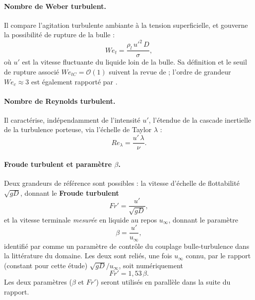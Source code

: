 \paragraph{Nombre de Weber turbulent.} Il compare l'agitation turbulente
ambiante à
la tension superficielle, et gouverne la possibilité de rupture de la
bulle :
\begin{equation}
    We_t = \frac{\rho_l\, u'^2\, D}{\sigma},
    \label{eq:wet}
\end{equation}
où $u'$ est la vitesse fluctuante du liquide loin de la bulle. Sa
définition et le seuil de rupture associé $We_{tC}=\mathcal{O}(1)$ suivent la
revue de \cite{legendre2025} ; l'ordre de grandeur $We_c\approx3$ est
également rapporté par \cite{riviere2021}.

\paragraph{Nombre de Reynolds turbulent.} Il caractérise, indépendamment de
l'intensité $u'$, l'étendue de la cascade inertielle de la turbulence
porteuse, via l'échelle de Taylor $\lambda$ :
\begin{equation}
    Re_\lambda = \frac{u'\,\lambda}{\nu}.
    \label{eq:relambda}
\end{equation}

\paragraph{Froude turbulent et paramètre $\beta$.} Deux
grandeurs de référence sont possibles : la vitesse d'échelle de flottabilité
$\sqrt{gD}$, donnant le \textbf{Froude turbulent}
\begin{equation}
    Fr' = \frac{u'}{\sqrt{gD}},
    \label{eq:frprime}
\end{equation}
et la vitesse terminale \emph{mesurée} en liquide au repos $u_\infty$,
donnant le paramètre
\begin{equation}
    \beta = \frac{u'}{u_\infty},
    \label{eq:beta}
\end{equation}
identifié par \cite{legendre2025} comme un paramètre de contrôle du
couplage bulle-turbulence dans la littérature du domaine. Les deux sont
reliés, une fois $u_\infty$ connu, par le rapport (constant pour cette étude)
$\sqrt{gD}/u_\infty$, soit numériquement
\begin{equation}
    Fr' = 1{,}53\,\beta.
    \label{eq:fr_beta}
\end{equation}
Les deux paramètres ($\beta$ et $Fr'$) seront utilisés en parallèle dans la suite du rapport.

